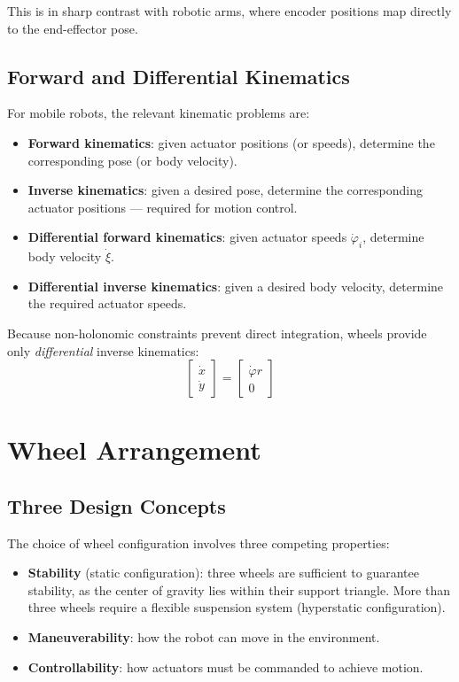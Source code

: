 \documentclass[11pt,a4paper]{article}
\theoremstyle{definition}
\theoremstyle{plain}
\theoremstyle{remark}
\begin{document}
This is in sharp contrast with robotic arms, where encoder positions map directly to the end-effector pose.

\subsection{Forward and Differential Kinematics}

For mobile robots, the relevant kinematic problems are:

\begin{itemize}
    \item \textbf{Forward kinematics}: given actuator positions (or speeds), determine the corresponding pose (or body velocity).
    \item \textbf{Inverse kinematics}: given a desired pose, determine the corresponding actuator positions — required for motion control.
    \item \textbf{Differential forward kinematics}: given actuator speeds $\dot{\varphi}_i$, determine body velocity $\dot{\xi}$.
    \item \textbf{Differential inverse kinematics}: given a desired body velocity, determine the required actuator speeds.
\end{itemize}

Because non-holonomic constraints prevent direct integration, wheels provide only \textit{differential} inverse kinematics:
\[
\begin{bmatrix} \dot{x} \\ \dot{y} \end{bmatrix} = \begin{bmatrix} \dot{\varphi} r \\ 0 \end{bmatrix}
\]

\section{Wheel Arrangement}

\subsection{Three Design Concepts}

The choice of wheel configuration involves three competing properties:
\begin{itemize}
    \item \textbf{Stability} (static configuration): three wheels are sufficient to guarantee stability, as the center of gravity lies within their support triangle. More than three wheels require a flexible suspension system (hyperstatic configuration).
    \item \textbf{Maneuverability}: how the robot can move in the environment.
    \item \textbf{Controllability}: how actuators must be commanded to achieve motion.
\end{itemize}
\end{document}
